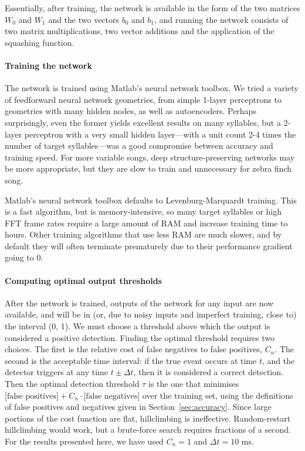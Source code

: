 \documentclass[10pt,letterpaper]{article}
\let\oldmarginpar\marginpar
\renewcommand{\marginpar}[1]{\oldmarginpar{\linespread{1}\scriptsize{#1}}}
\renewcommand{\subsubsection}[1]{\paragraph{#1}}
\begin{document}
Essentially, after training, the network is available in the form of the two matrices $W_0$ and $W_1$ and the two vectors $b_0$ and $b_1$, and running the network consists of two matrix multiplications, two vector additions and the application of the squashing function.\marginpar{I've left some other details.  Ok?}

\subsubsection{Training the network}

The network is trained using Matlab's neural network toolbox. We tried
a variety of feedforward neural network geometries, from simple
1-layer perceptrons to geometries with many hidden
nodes, as well as autoencoders. Perhaps surprisingly, even the former yields excellent results
on many syllables, but a 2-layer perceptron with a very small hidden
layer---with a unit count 2-4 times the number of target
syllables---was a good compromise between accuracy and training
speed. For more variable
songs, deep structure-preserving networks may be more appropriate, but
they are slow to train and unnecessary for zebra finch song.

Matlab's neural network toolbox defaults to Levenburg-Marquardt
training. This is a fast algorithm, but is memory-intensive, so
many target syllables or high FFT frame rates require a large
amount of RAM and increase training time to hours. Other training
algorithms that use less RAM are much slower, and by default they will
often terminate prematurely due to their performance gradient
going to 0.

\subsubsection{Computing optimal output thresholds}
\label{sec:optimalthresholds}
After the network is trained, outputs of the network for any input
are now available, and will be in (or, due to noisy inputs and imperfect training, close to) the
interval (0, 1). We must choose a threshold above which the output is
considered a positive detection. Finding the optimal threshold
requires two choices. The first is the relative cost of false
negatives to false positives, $C_n$. The second is the acceptable time
interval: if the true event occurs at time $t$, and the detector
triggers at any time $t\pm\Delta t$, then it is considered a correct
detection. Then the optimal detection threshold $\tau$ is the one that
minimises $\mbox{[false positives]} +C_n\cdot\mbox{[false negatives]}$
over the training set, using the definitions of false positives and
negatives given in Section~\ref{sec:accuracy}. Since large
portions of the cost function are flat, hillclimbing is ineffective.  Random-restart hillclimbing
would work, but a brute-force search requires fractions of a
second. For the results presented here, we have used $C_n=1$ and $\Delta t=10$ ms.
\end{document}
